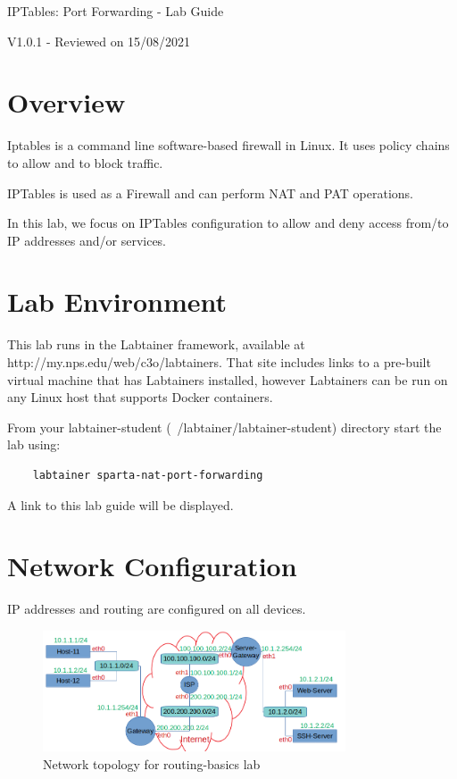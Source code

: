 


\begin{center}
{\LARGE IPTables: Port Forwarding - Lab Guide}

V1.0.1 - Reviewed on 15/08/2021
\vspace{0.1in}\\
\end{center}

\copyrightnotice

\section{Overview}
Iptables is a command line software-based firewall in Linux. It uses policy chains to allow and to block traffic.

IPTables is used as a Firewall and can perform NAT and PAT operations.

In this lab, we focus on IPTables configuration to allow and deny access from/to IP addresses and/or services.

\section{Lab Environment}
This lab runs in the Labtainer framework,
available at http://my.nps.edu/web/c3o/labtainers.
That site includes links to a pre-built virtual machine
that has Labtainers installed, however Labtainers can
be run on any Linux host that supports Docker containers.

From your labtainer-student (~/labtainer/labtainer-student) directory start the lab using:
\begin{verbatim}
    labtainer sparta-nat-port-forwarding
\end{verbatim}
\noindent A link to this lab guide will be displayed.

\section{Network Configuration}
IP addresses and routing are configured on all devices.

\begin{figure}[H]
\begin{center}
\includegraphics [width=0.8\textwidth]{labtainers-port-forwarding-lab-01.png}
\end{center}
\caption{Network topology for routing-basics lab}
\label{fig:topology}
\end{figure}

